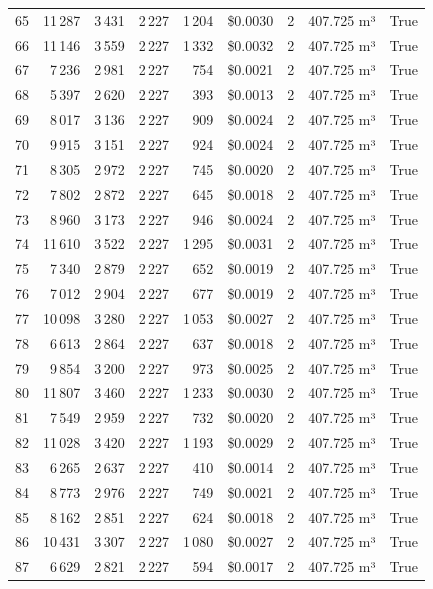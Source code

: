 \documentclass[a4paper,11pt]{article}
\begin{document}
\begin{table}[ht]
\begin{tabular}{r r r r r r r p{3cm} l}
65 & 11\,287 & 3\,431 & 2\,227 & 1\,204 & \$0.0030 & 2 & 407.725 m³ & True \\
66 & 11\,146 & 3\,559 & 2\,227 & 1\,332 & \$0.0032 & 2 & 407.725 m³ & True \\
67 & 7\,236 & 2\,981 & 2\,227 & 754 & \$0.0021 & 2 & 407.725 m³ & True \\
68 & 5\,397 & 2\,620 & 2\,227 & 393 & \$0.0013 & 2 & 407.725 m³ & True \\
69 & 8\,017 & 3\,136 & 2\,227 & 909 & \$0.0024 & 2 & 407.725 m³ & True \\
70 & 9\,915 & 3\,151 & 2\,227 & 924 & \$0.0024 & 2 & 407.725 m³ & True \\
71 & 8\,305 & 2\,972 & 2\,227 & 745 & \$0.0020 & 2 & 407.725 m³ & True \\
72 & 7\,802 & 2\,872 & 2\,227 & 645 & \$0.0018 & 2 & 407.725 m³ & True \\
73 & 8\,960 & 3\,173 & 2\,227 & 946 & \$0.0024 & 2 & 407.725 m³ & True \\
74 & 11\,610 & 3\,522 & 2\,227 & 1\,295 & \$0.0031 & 2 & 407.725 m³ & True \\
75 & 7\,340 & 2\,879 & 2\,227 & 652 & \$0.0019 & 2 & 407.725 m³ & True \\
76 & 7\,012 & 2\,904 & 2\,227 & 677 & \$0.0019 & 2 & 407.725 m³ & True \\
77 & 10\,098 & 3\,280 & 2\,227 & 1\,053 & \$0.0027 & 2 & 407.725 m³ & True \\
78 & 6\,613 & 2\,864 & 2\,227 & 637 & \$0.0018 & 2 & 407.725 m³ & True \\
79 & 9\,854 & 3\,200 & 2\,227 & 973 & \$0.0025 & 2 & 407.725 m³ & True \\
80 & 11\,807 & 3\,460 & 2\,227 & 1\,233 & \$0.0030 & 2 & 407.725 m³ & True \\
81 & 7\,549 & 2\,959 & 2\,227 & 732 & \$0.0020 & 2 & 407.725 m³ & True \\
82 & 11\,028 & 3\,420 & 2\,227 & 1\,193 & \$0.0029 & 2 & 407.725 m³ & True \\
83 & 6\,265 & 2\,637 & 2\,227 & 410 & \$0.0014 & 2 & 407.725 m³ & True \\
84 & 8\,773 & 2\,976 & 2\,227 & 749 & \$0.0021 & 2 & 407.725 m³ & True \\
85 & 8\,162 & 2\,851 & 2\,227 & 624 & \$0.0018 & 2 & 407.725 m³ & True \\
86 & 10\,431 & 3\,307 & 2\,227 & 1\,080 & \$0.0027 & 2 & 407.725 m³ & True \\
87 & 6\,629 & 2\,821 & 2\,227 & 594 & \$0.0017 & 2 & 407.725 m³ & True \\

\end{tabular}
\end{table}
\end{document}
